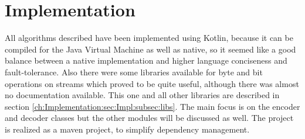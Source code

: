 \chapter{Implementation}
\label{ch:Implementation}
All algorithms described have been implemented using Kotlin, because it can be compiled for the Java Virtual Machine as well as native, so it seemed like a good balance between a native implementation and higher language conciseness and fault-tolerance. Also there were some libraries available for byte and bit operations on streams which proved to be quite useful, although there was almost no documentation available. This one and all other libraries are described in section \ref{ch:Implementation:sec:Impl:subsec:libs}. The main focus is on the encoder and decoder classes but the other modules will be discussed as well. The project is realized as a maven project, to simplify dependency management. 

